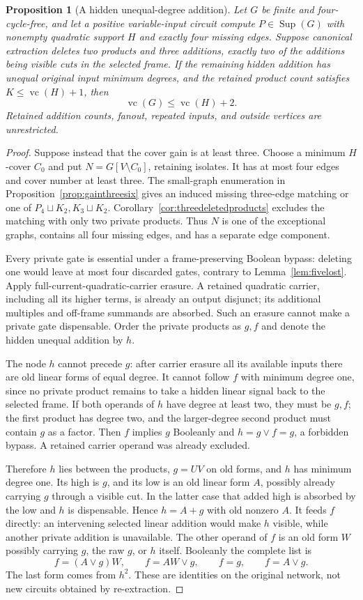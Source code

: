 \documentclass[11pt]{article}
\newcommand{\Sup}{\operatorname{Sup}}
\newcommand{\vc}{\operatorname{vc}}
\newtheorem{proposition}[theorem]{Proposition}
\theoremstyle{definition}
\theoremstyle{remark}
\begin{document}
\begin{proposition}[A hidden unequal-degree addition]\label{prop:hiddenunequal}
Let $G$ be finite and four-cycle-free, and let a positive variable-input circuit compute $P\in\Sup(G)$ with nonempty quadratic support $H$ and exactly four missing edges. Suppose canonical extraction deletes two products and three additions, exactly two of the additions being visible cuts in the selected frame. If the remaining hidden addition has unequal original input minimum degrees, and the retained product count satisfies $K\le\vc(H)+1$, then
\[
 \vc(G)\le\vc(H)+2.
\]
Retained addition counts, fanout, repeated inputs, and outside vertices are unrestricted.
\end{proposition}
\begin{proof}
Suppose instead that the cover gain is at least three. Choose a minimum $H$-cover $C_0$ and put $N=G[V\setminus C_0]$, retaining isolates. It has at most four edges and cover number at least three. The small-graph enumeration in Proposition~\ref{prop:gainthreesix} gives an induced missing three-edge matching or one of $P_4\sqcup K_2,K_3\sqcup K_2$. Corollary~\ref{cor:threedeletedproducts} excludes the matching with only two private products. Thus $N$ is one of the exceptional graphs, contains all four missing edges, and has a separate edge component.

Every private gate is essential under a frame-preserving Boolean bypass: deleting one would leave at most four discarded gates, contrary to Lemma~\ref{lem:fivelost}. Apply full-current-quadratic-carrier erasure. A retained quadratic carrier, including all its higher terms, is already an output disjunct; its additional multiples and off-frame summands are absorbed. Such an erasure cannot make a private gate dispensable. Order the private products as $g,f$ and denote the hidden unequal addition by $h$.

The node $h$ cannot precede $g$: after carrier erasure all its available inputs there are old linear forms of equal degree. It cannot follow $f$ with minimum degree one, since no private product remains to take a hidden linear signal back to the selected frame. If both operands of $h$ have degree at least two, they must be $g,f$; the first product has degree two, and the larger-degree second product must contain $g$ as a factor. Then $f$ implies $g$ Booleanly and $h=g\vee f=g$, a forbidden bypass. A retained carrier operand was already excluded.

Therefore $h$ lies between the products, $g=UV$ on old forms, and $h$ has minimum degree one. Its high is $g$, and its low is an old linear form $A$, possibly already carrying $g$ through a visible cut. In the latter case that added high is absorbed by the low and $h$ is dispensable. Hence $h=A+g$ with old nonzero $A$. It feeds $f$ directly: an intervening selected linear addition would make $h$ visible, while another private addition is unavailable. The other operand of $f$ is an old form $W$ possibly carrying $g$, the raw $g$, or $h$ itself. Booleanly the complete list is
\[
 f=(A\vee g)W,\qquad f=AW\vee g,\qquad f=g,\qquad f=A\vee g.
\]
The last form comes from $h^2$. These are identities on the original network, not new circuits obtained by re-extraction.


\end{proof}
\end{document}
